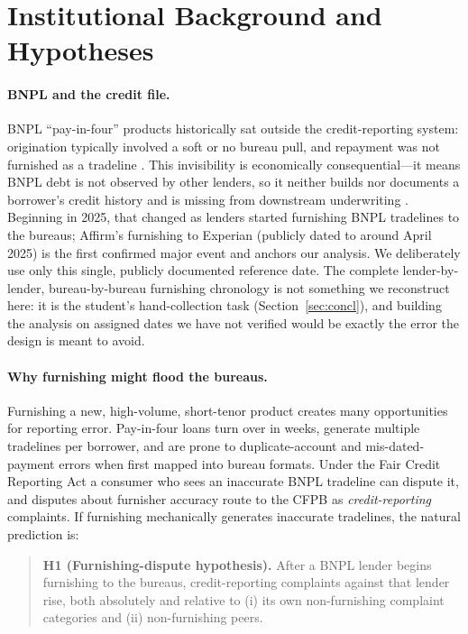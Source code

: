 \documentclass[12pt]{article}
\begin{document}
\section{Institutional Background and Hypotheses}\label{sec:bg}
\paragraph{BNPL and the credit file.} BNPL ``pay-in-four'' products historically sat outside
the credit-reporting system: origination typically involved a soft or no bureau pull, and
repayment was not furnished as a tradeline \citep{cfpb2022,dimaggio2022}. This invisibility is
economically consequential---it means BNPL debt is not observed by other lenders, so it neither
builds nor documents a borrower's credit history and is missing from downstream underwriting
\citep{guttman2023}. Beginning in 2025, that changed as lenders started furnishing BNPL
tradelines to the bureaus; Affirm's furnishing to Experian (publicly dated to around April
2025) is the first confirmed major event and anchors our analysis. We deliberately use only
this single, publicly documented reference date. The complete lender-by-lender, bureau-by-bureau
furnishing chronology is not something we reconstruct here: it is the student's hand-collection
task (Section~\ref{sec:concl}), and building the analysis on assigned dates we have not verified
would be exactly the error the design is meant to avoid.

\paragraph{Why furnishing might flood the bureaus.} Furnishing a new, high-volume, short-tenor
product creates many opportunities for reporting error. Pay-in-four loans turn over in weeks,
generate multiple tradelines per borrower, and are prone to duplicate-account and
mis-dated-payment errors when first mapped into bureau formats. Under the Fair Credit Reporting
Act a consumer who sees an inaccurate BNPL tradeline can dispute it, and disputes about
furnisher accuracy route to the CFPB as \emph{credit-reporting} complaints. If furnishing
mechanically generates inaccurate tradelines, the natural prediction is:
\begin{quote}
\textbf{H1 (Furnishing-dispute hypothesis).} After a BNPL lender begins furnishing to the
bureaus, credit-reporting complaints against that lender rise, both absolutely and relative to
(i) its own non-furnishing complaint categories and (ii) non-furnishing peers.
\end{quote}
\end{document}
